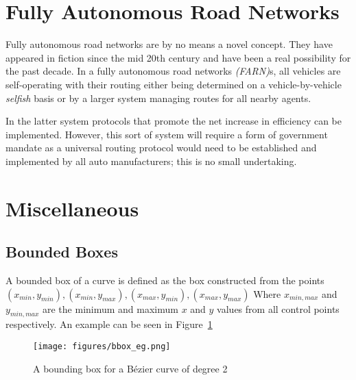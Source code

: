 \section{Fully Autonomous Road Networks}

Fully autonomous road networks are by no means a novel concept. They have appeared in fiction since the mid 20th century and have been a real possibility for the past decade. In a fully autonomous road networks \textit{(FARN)}s, all vehicles are self-operating with their routing either being determined on a vehicle-by-vehicle \textit{selfish} basis or by a larger system managing routes for all nearby agents. 

In the latter system protocols that promote the net increase in efficiency can be implemented. However, this sort of system will require a form of government mandate as a universal routing protocol would need to be established and implemented by all auto manufacturers; this is no small undertaking.

\section{Miscellaneous}

\subsection{Bounded Boxes}
\label{subsec:back_boundedboxes}

  A bounded box of a curve is defined as the box constructed from the points $(x_{min},y_{min}), (x_{min},y_{max}), (x_{max},y_{min}), (x_{max},y_{max})$ Where $x_{min,max}$ and $y_{min,max}$ are the minimum and maximum $x$ and $y$ values from all control points respectively. An example can be seen in Figure~\ref{fig:bboxeg}

 \begin{figure}[ht]
   \centering
   \texttt{[image: figures/bbox\_eg.png]}
   \caption{\label{fig:bboxeg} A bounding box for a Bézier curve of degree 2}
 \end{figure}



